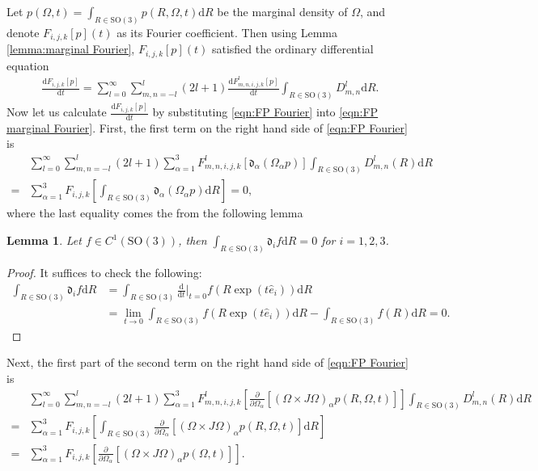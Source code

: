 \documentclass[10pt]{article}
\newtheorem{lemma}{Lemma}
\newcommand{\SO}{\ensuremath{\mathrm{SO}(3)}}
\newcommand{\diff}[1]{\mathrm{d}#1}
\newcommand{\liediff}{\mathfrak{d}}
\begin{document}
Let $p(\Omega,t) = \int_{R\in\SO}p(R,\Omega,t)\diff{R}$ be the marginal density of $\Omega$, and denote $F_{i,j,k}[p](t)$ as its Fourier coefficient.
Then using Lemma \ref{lemma:marginal Fourier}, $F_{i,j,k}[p](t)$ satisfied the ordinary differential equation
\begin{align} \label{eqn:FP marginal Fourier}
	\frac{\diff{F_{i,j,k}[p]}}{\diff{t}} = \sum_{l=0}^\infty \sum_{m,n=-l}^l (2l+1) \frac{\diff{F^l_{m,n,i,j,k}[p]}}{\diff{t}} \int_{R\in\SO} D^l_{m,n} \diff{R}.
\end{align}
Now let us calculate $\frac{\diff{F_{i,j,k}[p]}}{\diff{t}}$ by substituting \eqref{eqn:FP Fourier} into \eqref{eqn:FP marginal Fourier}.
First, the first term on the right hand side of \eqref{eqn:FP Fourier} is
\begin{align*}
	&\sum_{l=0}^\infty \sum_{m,n=-l}^l (2l+1) \sum_{\alpha=1}^3 F^l_{m,n,i,j,k}[\liediff_\alpha(\Omega_\alpha p)] \int_{R\in\SO} D^l_{m,n}(R) \diff{R} \\
	= &\sum_{\alpha=1}^3 F_{i,j,k}\left[ \int_{R\in\SO} \liediff_\alpha(\Omega_\alpha p) \diff{R} \right] = 0,
\end{align*}
where the last equality comes the from the following lemma
\begin{lemma}
	Let $f\in C^1(\SO)$, then $\int_{R\in\SO} \liediff_i f \diff{R} = 0$ for $i=1,2,3$.
\end{lemma}
\begin{proof}
	It suffices to check the following:
	\begin{align*}
		\int_{R\in\SO} \liediff_i f\diff{R} &= \int_{R\in\SO} \frac{\diff{}}{\diff{t}} \bigg\lvert_{t=0} f(R\exp(t\hat{e}_i)) \diff{R} \\
		&= \lim\limits_{t\to 0} \int_{R\in\SO} f(R\exp(t\hat{e}_i)) \diff{R} - \int_{R\in\SO} f(R) \diff{R} = 0.
	\end{align*}
\end{proof}
Next, the first part of the second term on the right hand side of \eqref{eqn:FP Fourier} is
\begin{align*}
	&\sum_{l=0}^\infty \sum_{m,n=-l}^l (2l+1) \sum_{\alpha=1}^3 F^l_{m,n,i,j,k}\left[ \frac{\partial}{\partial\Omega_\alpha} [(\Omega\times J\Omega)_\alpha p(R,\Omega,t)] \right] \int_{R\in\SO} D^l_{m,n}(R) \diff{R} \\
	= &\sum_{\alpha=1}^3 F_{i,j,k} \left[ \int_{R\in\SO} \frac{\partial}{\partial\Omega_\alpha} [(\Omega\times J\Omega)_\alpha p(R,\Omega,t)] \diff{R} \right] \\
	= &\sum_{\alpha=1}^3 F_{i,j,k} \left[ \frac{\partial}{\partial\Omega_\alpha} [(\Omega\times J\Omega)_\alpha p(\Omega,t)] \right].
\end{align*}
\end{document}
